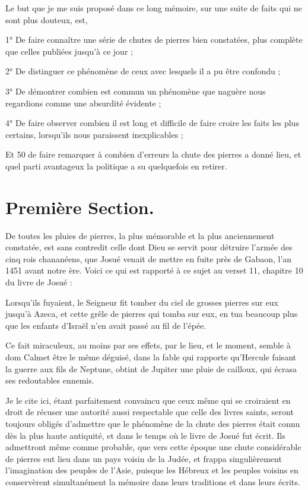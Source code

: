 \documentclass[a4paper, 12pt, oneside, french]{article}
\begin{document}
Le but que je me suis proposé dans ce long mémoire, sur une suite de faits qui ne sont plus douteux, est,

1° De faire connaître une série de chutes de pierres bien constatées, plus complète que celles publiées jusqu'à ce jour ;

2° De distinguer ce phénomène de ceux avec lesquels il a pu être confondu ;

3° De démontrer combien est commun un phénomène que naguère nous regardions comme une absurdité évidente ;

4° De faire observer combien il est long et difficile de faire croire les faits les plus certains, lorsqu'ils nous paraissent inexplicables ;

Et 50 de faire remarquer à combien d'erreurs la chute des pierres a donné lieu, et quel parti avantageux la politique a su quelquefois en retirer.
\clearpage
\section{Première Section.}
De toutes les pluies de pierres, la plus mémorable et la plus anciennement constatée, est sans contredit celle dont Dieu se servit pour détruire l'armée des cinq rois chananéens, que Josué venait de mettre en fuite près de Gabaon, l'an 1451 avant notre ère. Voici ce qui est rapporté à ce sujet au verset 11, chapitre 10 du livre de Josué :

\og Lorsqu'ils fuyaient, le Seigneur fit tomber du ciel de grosses pierres sur eux jusqu'à Azeca, et cette grêle de pierres qui tomba sur eux, en tua beaucoup plus que les enfants d'Israël n'en avait passé au fil de l'épée. \fg

Ce fait miraculeux, au moins par ses effets, par le lieu, et le moment, semble à dom Calmet être le même déguisé, dans la fable qui rapporte qu'Hercule faisant la guerre aux fils de Neptune, obtint de Jupiter une pluie de cailloux, qui écrasa ses redoutables ennemis.

Je le cite ici, étant parfaitement convaincu que ceux même qui se croiraient en droit de récuser une autorité aussi respectable que celle des livres saints, seront toujours obligés d'admettre que le phénomène de la chute des pierres était connu dès la plus haute antiquité, et dans le temps où le livre de Josué fut écrit. Ils admettront même comme probable, que vers cette époque une chute considérable de pierres eut lieu dans un pays voisin de la Judée, et frappa singulièrement l'imagination des peuples de l'Asie, puisque les Hébreux et les peuples voisins en conservèrent simultanément la mémoire dans leurs traditions et dans leurs écrits.
\end{document}
